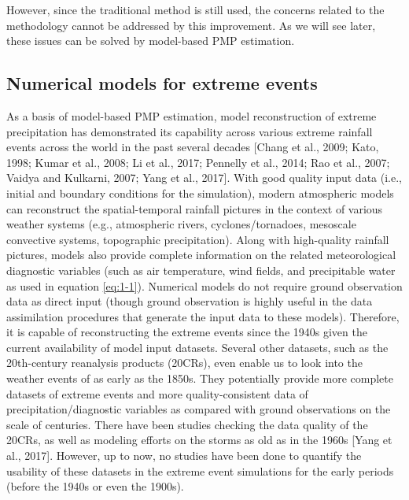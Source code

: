 However, since the traditional method is still used, the concerns related to the methodology cannot be addressed by this improvement. As we will see later, these issues can be solved by model-based PMP estimation.

\subsection{Numerical models for extreme events}

As a basis of model-based PMP estimation, model reconstruction of extreme precipitation has demonstrated its capability across various extreme rainfall events across the world in the past several decades [Chang et al., 2009; Kato, 1998; Kumar et al., 2008; Li et al., 2017; Pennelly et al., 2014; Rao et al., 2007; Vaidya and Kulkarni, 2007; Yang et al., 2017]. With good quality input data (i.e., initial and boundary conditions for the simulation), modern atmospheric models can reconstruct the spatial-temporal rainfall pictures in the context of various weather systems (e.g., atmospheric rivers, cyclones/tornadoes, mesoscale convective systems, topographic precipitation). Along with high-quality rainfall pictures, models also provide complete information on the related meteorological diagnostic variables (such as air temperature, wind fields, and precipitable water as used in equation \ref{eq:1-1}). Numerical models do not require ground observation data as direct input (though ground observation is highly useful in the data assimilation procedures that generate the input data to these models). Therefore, it is capable of reconstructing the extreme events since the 1940s given the current availability of model input datasets. Several other datasets, such as the 20th-century reanalysis products (20CRs), even enable us to look into the weather events of as early as the 1850s. They potentially provide more complete datasets of extreme events and more quality-consistent data of precipitation/diagnostic variables as compared with ground observations on the scale of centuries. There have been studies checking the data quality of the 20CRs, as well as modeling efforts on the storms as old as in the 1960s [Yang et al., 2017]. However, up to now, no studies have been done to quantify the usability of these datasets in the extreme event simulations for the early periods (before the 1940s or even the 1900s).

